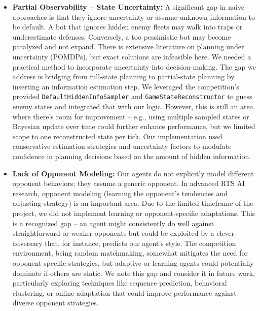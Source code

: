 \documentclass[conference]{IEEEtran}
\begin{document}
\begin{itemize}
\item \textbf{Partial Observability -- State Uncertainty:} A significant gap in naive approaches is that they ignore uncertainty or assume unknown information to be default. A bot that ignores hidden enemy fleets may walk into traps or underestimate defenses. Conversely, a too pessimistic bot may become paralyzed and not expand. There is extensive literature on planning under uncertainty (POMDPs), but exact solutions are infeasible here. We needed a practical method to incorporate uncertainty into decision-making. The gap we address is bridging from full-state planning to partial-state planning by inserting an information estimation step. We leveraged the competition's provided \texttt{DefaultHiddenInfoSampler} and \texttt{GameStateReconstructor} to guess enemy states and integrated that with our logic. However, this is still an area where there's room for improvement -- e.g., using multiple sampled states or Bayesian update over time could further enhance performance, but we limited scope to one reconstructed state per tick. Our implementation used conservative estimation strategies and uncertainty factors to modulate confidence in planning decisions based on the amount of hidden information.

\item \textbf{Lack of Opponent Modeling:} Our agents do not explicitly model different opponent behaviors; they assume a generic opponent. In advanced RTS AI research, opponent modeling (learning the opponent's tendencies and adjusting strategy) is an important area. Due to the limited timeframe of the project, we did not implement learning or opponent-specific adaptations. This is a recognized gap -- an agent might consistently do well against straightforward or weaker opponents but could be exploited by a clever adversary that, for instance, predicts our agent's style. The competition environment, being random matchmaking, somewhat mitigates the need for opponent-specific strategies, but adaptive or learning agents could potentially dominate if others are static. We note this gap and consider it in future work, particularly exploring techniques like sequence prediction, behavioral clustering, or online adaptation that could improve performance against diverse opponent strategies.


\end{itemize}
\end{document}
